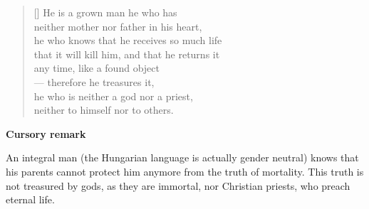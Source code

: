 \documentclass[a4paper,12pt,twoside,final]{book}
\begin{document}
\newpage


\settowidth{\versewidth}{he who knows that he receives so much life}

\begin{verse}[\versewidth]
  He is a grown man he who has \\
  neither mother nor father in his heart, \\
  he who knows that he receives so much life \\
  that it will kill him, and that he returns it \\
  any time, like a found object \\
  --- therefore he treasures it, \\
  he who is neither a god nor a priest, \\
  neither to himself nor to others. \\
\end{verse}


\bigskip

\noindent \textbf{Cursory remark}

\medskip

An integral man (the Hungarian language is actually gender neutral)
knows that his parents cannot protect him anymore from the truth of
mortality. This truth is not treasured by gods, as they are immortal,
nor Christian priests, who preach eternal life.

\newpage

\settowidth{\versewidth}{s mint talált tárgyat visszaadja}
\end{document}

